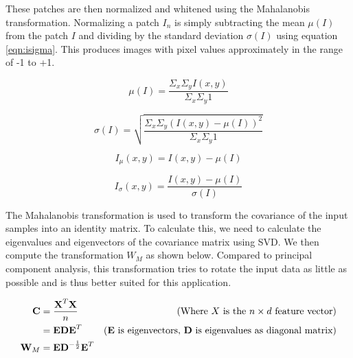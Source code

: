\documentclass{article} %
\begin{document}
        These patches are then normalized and whitened using the Mahalanobis transformation. Normalizing a patch $I_n$ is simply subtracting the mean $\mu(I)$ from the patch $I$ and dividing by the standard deviation $\sigma(I)$ using equation \ref{eqn:isigma}. This produces images with pixel values approximately in the range of -1 to +1.
        
\begin{equation}
\mu(I) = \frac{\Sigma_x \Sigma_y I(x,y)}{\Sigma_x \Sigma_y 1}
\end{equation}

\begin{equation}
\sigma(I) = \sqrt{\frac{\Sigma_x \Sigma_y (I(x,y) - \mu(I))^2}{\Sigma_x \Sigma_y 1}}
\end{equation}

\begin{equation}
I_{\mu}(x,y) = I(x,y) - \mu(I)
\end{equation}

\begin{equation}
I_{\sigma}(x,y) = \frac{I(x,y) - \mu(I)}{\sigma(I)}
\label{eqn:isigma}
\end{equation}
        

        The Mahalanobis transformation \cite{anthony} is used to transform the covariance of the input samples into an identity matrix. To calculate this, we need to calculate the eigenvalues and eigenvectors of the covariance matrix using SVD. We then compute the transformation \textbf{$W_{M}$} as shown below. Compared to principal component analysis, this transformation tries to rotate the input data as little as possible and is thus better suited for this application.

        \begin{align*}
            \textbf{C} &= \frac{\textbf{X}^{T}\textbf{X}}{n} & \text{(Where $X$ is the $n\times d$ feature vector)}\\
            &= \textbf{EDE}^{T} & \text{(\textbf{E} is eigenvectors, \textbf{D} is eigenvalues as diagonal matrix)}\\
            \textbf{W}_{M} &= \textbf{ED}^{-\frac{1}{2}}\textbf{E}^{T}\\
        \end{align*}
\end{document}
